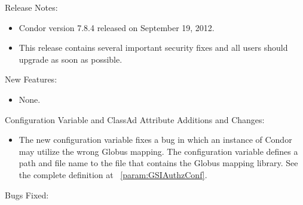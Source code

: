 \noindent Release Notes:

\begin{itemize}

\item Condor version 7.8.4 released on September 19, 2012.

\item This release contains several important security fixes and all users should upgrade as soon as possible.

\end{itemize}


\noindent New Features:

\begin{itemize}

\item None.

\end{itemize}

\noindent Configuration Variable and ClassAd Attribute Additions and Changes:

\begin{itemize}

\item The new configuration variable 
fixes a bug in which an instance of Condor may utilize the  
wrong Globus mapping.
The configuration variable defines a path and file name 
to the file that contains the Globus mapping library. 
See the complete definition at
~\ref{param:GSIAuthzConf}.


\end{itemize}

\noindent Bugs Fixed:

